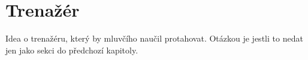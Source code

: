 \chapter{Trenažér}

Idea o trenažéru, který by mluvčího naučil protahovat. Otázkou je jestli to nedat jen jako sekci do předchozí kapitoly.
